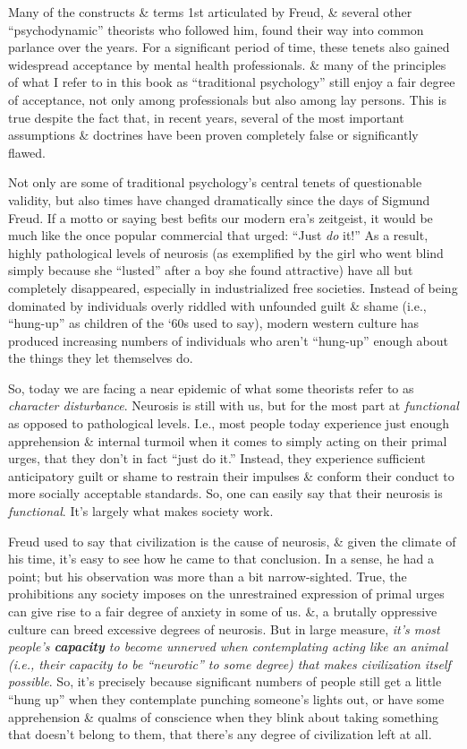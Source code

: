 \documentclass{article}
\numberwithin{equation}{section}
\begin{document}
Many of the constructs \& terms 1st articulated by Freud, \& several other ``psychodynamic'' theorists who followed him, found their way into common parlance over the years. For a significant period of time, these tenets also gained widespread acceptance by mental health professionals. \& many of the principles of what I refer to in this book as ``traditional psychology'' still enjoy a fair degree of acceptance, not only among professionals but also among lay persons. This is true despite the fact that, in recent years, several of the most important assumptions \& doctrines have been proven completely false or significantly flawed.

Not only are some of traditional psychology's central tenets of questionable validity, but also times have changed dramatically since the days of Sigmund Freud. If a motto or saying best befits our modern era's zeitgeist, it would be much like the once popular commercial that urged: ``Just \textit{do} it!'' As a result, highly pathological levels of neurosis (as exemplified by the girl who went blind simply because she ``lusted'' after a boy she found attractive) have all but completely disappeared, especially in industrialized free societies. Instead of being dominated by individuals overly riddled with unfounded guilt \& shame (i.e., ``hung-up'' as children of the `60s used to say), modern western culture has produced increasing numbers of individuals who aren't ``hung-up'' enough about the things they let themselves do.

So, today we are facing a near epidemic of what some theorists refer to as \textit{character disturbance}. Neurosis is still with us, but for the most part at \textit{functional} as opposed to pathological levels. I.e., most people today experience just enough apprehension \& internal turmoil when it comes to simply acting on their primal urges, that they don't in fact ``just do it.'' Instead, they experience sufficient anticipatory guilt or shame to restrain their impulses \& conform their conduct to more socially acceptable standards. So, one can easily say that their neurosis is \textit{functional}. It's largely what makes society work.

Freud used to say that civilization is the cause of neurosis, \& given the climate of his time, it's easy to see how he came to that conclusion. In a sense, he had a point; but his observation was more than a bit narrow-sighted. True, the prohibitions any society imposes on the unrestrained expression of primal urges can give rise to a fair degree of anxiety in some of us. \&, a brutally oppressive culture can breed excessive degrees of neurosis. But in large measure, \textit{it's most people's \textbf{capacity} to become unnerved when contemplating acting like an animal (i.e., their capacity to be ``neurotic'' to some degree) that makes civilization itself possible}. So, it's precisely because significant numbers of people still get a little ``hung up'' when they contemplate punching someone's lights out, or have some apprehension \& qualms of conscience when they blink about taking something that doesn't belong to them, that there's any degree of civilization left at all.
\end{document}
